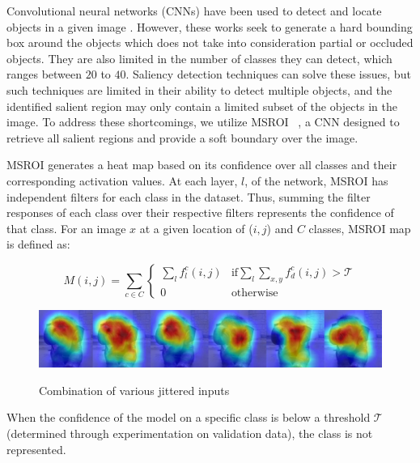 Convolutional neural networks (CNNs) have been used to detect and locate objects in a given image \cite{Erhan2014ScalableOD,Zhao_2015_CVPR}. 
However, these works seek to generate a hard bounding box around the objects which does not take into consideration partial or occluded objects.
They are also limited in the number of classes they can detect, which ranges between $20$ to $40$.
Saliency detection techniques can solve these issues, but such techniques are limited in their ability to detect multiple objects, and the identified salient region may only contain a limited subset of the objects in the image.
To address these shortcomings, we utilize MSROI  ~\cite{Prakash2017SemanticPI}, a CNN designed to retrieve all salient regions and provide a soft boundary over the image.

MSROI generates a heat map based on its confidence over all classes and their corresponding activation values. 
At each layer, $l$, of the network, MSROI has independent filters for each class in the dataset. 
Thus, summing the filter responses of each class over their respective filters represents the confidence of that class. 
For an image $x$ at a given location of ($i,j$) and $C$ classes, MSROI map is defined as:

\[
M(i,j) = \sum_{c \in C} \begin{cases}
                        \sum_l f_l^c(i,j) & \text{if} \sum_{l} \sum_{x,y} f_d^c(i,j) > \mathcal{T} \\
                        0 & \text{otherwise}
                        \end{cases}
\]

\begin{figure}
\includegraphics[scale=0.4]{figures/protect/out2_small_small.png}
     \label{fig:combination}
          \caption[Combination of various jittered inputs]{Combination of various jittered inputs}
 \end{figure}


When the confidence of the model on a specific class is below a threshold $\mathcal{T}$ (determined through experimentation on validation data), the class is not represented. 


